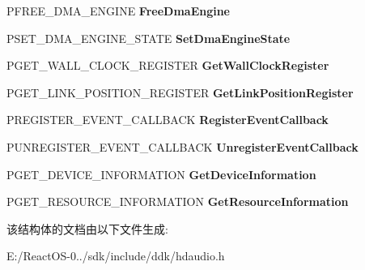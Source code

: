 \begin{DoxyCompactItemize}
P\+F\+R\+E\+E\+\_\+\+D\+M\+A\+\_\+\+E\+N\+G\+I\+NE {\bfseries Free\+Dma\+Engine}
\item 
\mbox{\label{struct___h_d_a_u_d_i_o___b_u_s___i_n_t_e_r_f_a_c_e___b_d_l_abc30717822597d4539dbb7e1d9f9340d}} 
P\+S\+E\+T\+\_\+\+D\+M\+A\+\_\+\+E\+N\+G\+I\+N\+E\+\_\+\+S\+T\+A\+TE {\bfseries Set\+Dma\+Engine\+State}
\item 
\mbox{\label{struct___h_d_a_u_d_i_o___b_u_s___i_n_t_e_r_f_a_c_e___b_d_l_a5c78477609111006ea9b5d7daca31154}} 
P\+G\+E\+T\+\_\+\+W\+A\+L\+L\+\_\+\+C\+L\+O\+C\+K\+\_\+\+R\+E\+G\+I\+S\+T\+ER {\bfseries Get\+Wall\+Clock\+Register}
\item 
\mbox{\label{struct___h_d_a_u_d_i_o___b_u_s___i_n_t_e_r_f_a_c_e___b_d_l_ac07f30cb86e72b671eda28582648c902}} 
P\+G\+E\+T\+\_\+\+L\+I\+N\+K\+\_\+\+P\+O\+S\+I\+T\+I\+O\+N\+\_\+\+R\+E\+G\+I\+S\+T\+ER {\bfseries Get\+Link\+Position\+Register}
\item 
\mbox{\label{struct___h_d_a_u_d_i_o___b_u_s___i_n_t_e_r_f_a_c_e___b_d_l_af3a6e65a2691e7ad918650569d216201}} 
P\+R\+E\+G\+I\+S\+T\+E\+R\+\_\+\+E\+V\+E\+N\+T\+\_\+\+C\+A\+L\+L\+B\+A\+CK {\bfseries Register\+Event\+Callback}
\item 
\mbox{\label{struct___h_d_a_u_d_i_o___b_u_s___i_n_t_e_r_f_a_c_e___b_d_l_a32135b249ed9df589eb05e3cf654d87b}} 
P\+U\+N\+R\+E\+G\+I\+S\+T\+E\+R\+\_\+\+E\+V\+E\+N\+T\+\_\+\+C\+A\+L\+L\+B\+A\+CK {\bfseries Unregister\+Event\+Callback}
\item 
\mbox{\label{struct___h_d_a_u_d_i_o___b_u_s___i_n_t_e_r_f_a_c_e___b_d_l_a95e4fa0256f79958d17f9a27b4f15197}} 
P\+G\+E\+T\+\_\+\+D\+E\+V\+I\+C\+E\+\_\+\+I\+N\+F\+O\+R\+M\+A\+T\+I\+ON {\bfseries Get\+Device\+Information}
\item 
\mbox{\label{struct___h_d_a_u_d_i_o___b_u_s___i_n_t_e_r_f_a_c_e___b_d_l_a44569a38d6b0c1c1a029f3960887777f}} 
P\+G\+E\+T\+\_\+\+R\+E\+S\+O\+U\+R\+C\+E\+\_\+\+I\+N\+F\+O\+R\+M\+A\+T\+I\+ON {\bfseries Get\+Resource\+Information}
\end{DoxyCompactItemize}


该结构体的文档由以下文件生成\+:\begin{DoxyCompactItemize}
\item 
E\+:/\+React\+O\+S-\/0../sdk/include/ddk/hdaudio.\+h\end{DoxyCompactItemize}
